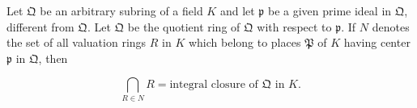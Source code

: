 Let $\mathfrak{Q}$ be an arbitrary subring of a field $K$ and let $\mathfrak{p}$ be a given prime ideal in $\mathfrak{Q}$, different from $\mathfrak{Q}$. Let $\mathfrak{Q}$ be the quotient ring of $\mathfrak{Q}$ with respect to $\mathfrak{p}$. If $N$ denotes the set of all valuation rings $R$ in $K$ which belong to places $\mathfrak{P}$ of $K$ having center $\mathfrak{p}$ in $\mathfrak{Q}$, then

$$\bigcap_{R \in N} R = \text{integral closure of } \mathfrak{Q} \text{ in } K.$$
